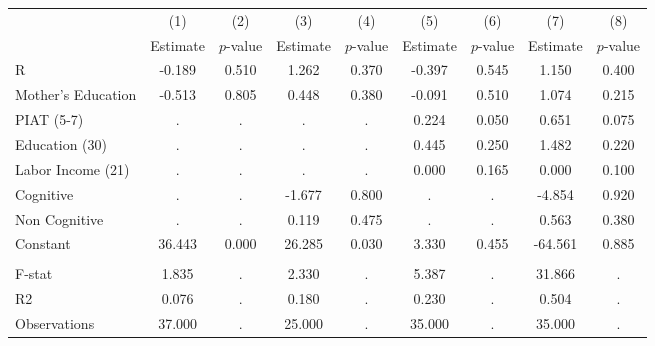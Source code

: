 \begin{tabular}{lcccccccc} \toprule
 & (1) & (2) & (3) & (4) & (5) & (6) & (7) & (8) \\ 
 & Estimate  & $p$-value  & Estimate  & $p$-value  & Estimate  & $p$-value  & Estimate  & $p$-value  \\  \midrule
R &    -0.189 &     0.510 &     1.262 &     0.370 &    -0.397 &     0.545 &     1.150 &     0.400 \\  
Mother's Education &    -0.513 &     0.805 &     0.448 &     0.380 &    -0.091 &     0.510 &     1.074 &     0.215 \\  
PIAT (5-7) &         . &         . &         . &         . &     0.224 &     0.050 &     0.651 &     0.075 \\  
Education (30) &         . &         . &         . &         . &     0.445 &     0.250 &     1.482 &     0.220 \\  
Labor Income (21) &         . &         . &         . &         . &     0.000 &     0.165 &     0.000 &     0.100 \\  
Cognitive &         . &         . &    -1.677 &     0.800 &         . &         . &    -4.854 &     0.920 \\  
Non Cognitive &         . &         . &     0.119 &     0.475 &         . &         . &     0.563 &     0.380 \\  
Constant &    36.443 &     0.000 &    26.285 &     0.030 &     3.330 &     0.455 &   -64.561 &     0.885 \\  \\ \midrule
F-stat &     1.835 &         . &     2.330 &         . &     5.387 &         . &    31.866 &         . \\  
R2 &     0.076 &         . &     0.180 &         . &     0.230 &         . &     0.504 &         . \\  
Observations &    37.000 &         . &    25.000 &         . &    35.000 &         . &    35.000 &         . \\  
\bottomrule \end{tabular}
